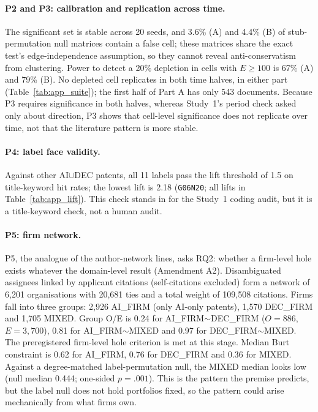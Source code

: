 \paragraph{P2 and P3: calibration and replication across time.} The significant set is stable across 20 seeds, and 3.6\% (A) and 4.4\% (B) of stub-permutation null matrices contain a false cell; these matrices share the exact test's edge-independence assumption, so they cannot reveal anti-conservatism from clustering. Power to detect a 20\% depletion in cells with $E \ge 100$ is 67\% (A) and 79\% (B). No depleted cell replicates in both time halves, in either part (Table~\ref{tab:app_suite}); the first half of Part A has only 543 documents. Because P3 requires significance in both halves, whereas Study~1's period check asked only about direction, P3 shows that cell-level significance does not replicate over time, not that the literature pattern is more stable.

\paragraph{P4: label face validity.} Against other AI$\cup$DEC patents, all 11 labels pass the lift threshold of 1.5 on title-keyword hit rates; the lowest lift is 2.18 (\texttt{G06N20}; all lifts in Table~\ref{tab:app_lift}). This check stands in for the Study~1 coding audit, but it is a title-keyword check, not a human audit.

\paragraph{P5: firm network.} P5, the analogue of the author-network lines, asks RQ2: whether a firm-level hole exists whatever the domain-level result (Amendment A2). Disambiguated assignees linked by applicant citations (self-citations excluded) form a network of 6,201 organisations with 20,681 ties and a total weight of 109,508 citations. Firms fall into three groups: 2,926 AI\_FIRM (only AI-only patents), 1,570 DEC\_FIRM and 1,705 MIXED. Group O/E is 0.24 for AI\_FIRM$\sim$DEC\_FIRM ($O = 886$, $E = 3{,}700$), 0.81 for AI\_FIRM$\sim$MIXED and 0.97 for DEC\_FIRM$\sim$MIXED. The preregistered firm-level hole criterion is met at this stage. Median Burt constraint \citep{burt1992structural} is 0.62 for AI\_FIRM, 0.76 for DEC\_FIRM and 0.36 for MIXED. Against a degree-matched label-permutation null, the MIXED median looks low (null median 0.444; one-sided $p = .001$). This is the pattern the premise predicts, but the label null does not hold portfolios fixed, so the pattern could arise mechanically from what firms own.

